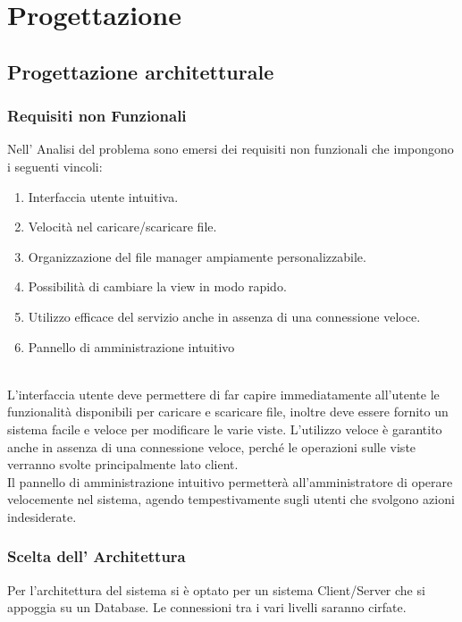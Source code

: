 \chapter*{Progettazione}
\section*{Progettazione architetturale}
\vspace{0.5cm}

\subsection*{Requisiti non Funzionali}
\vspace{0.5cm}
Nell' Analisi del problema sono emersi dei requisiti non funzionali che impongono i seguenti vincoli:

\begin{enumerate}
\item Interfaccia utente intuitiva.
\item Velocità nel caricare/scaricare file.
\item Organizzazione del file manager ampiamente personalizzabile.
\item Possibilità di cambiare la view in modo rapido.
\item Utilizzo efficace del servizio anche in assenza di una connessione veloce.
\item Pannello di amministrazione intuitivo
\end{enumerate}

\\
L'interfaccia utente deve permettere di far capire immediatamente all'utente le funzionalità disponibili per caricare e scaricare file, inoltre deve essere fornito un sistema facile e veloce per modificare le varie viste. L'utilizzo veloce è garantito anche in assenza di una connessione veloce, perché le operazioni sulle viste verranno svolte principalmente lato client.\\
Il pannello di amministrazione intuitivo permetterà all'amministratore di operare velocemente nel sistema, agendo tempestivamente sugli utenti che svolgono azioni indesiderate.


\subsection*{Scelta dell' Architettura}
Per l'architettura del sistema si è optato per un sistema Client/Server che si appoggia su un Database. Le connessioni tra i vari livelli saranno cirfate.
\vspace{0.5cm}
